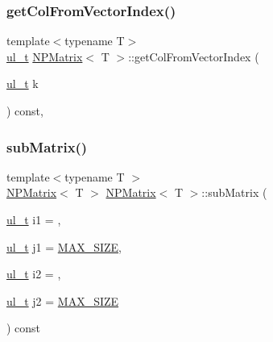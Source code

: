 \mbox{\label{class_n_p_matrix_a3ef7e9e257ba6119e369a9a3c633d35d}} 
\subsubsection{\texorpdfstring{getColFromVectorIndex()}{getColFromVectorIndex()}}
{\footnotesize\ttfamily template$<$typename T$>$ \\
\mbox{\hyperlink{group___n_algebra_ga1b140a2034db3f5dfe18a987745df43a}{ul\+\_\+t}} \mbox{\hyperlink{class_n_p_matrix}{N\+P\+Matrix}}$<$ T $>$\+::get\+Col\+From\+Vector\+Index (\begin{DoxyParamCaption}\item[{\mbox{\hyperlink{group___n_algebra_ga1b140a2034db3f5dfe18a987745df43a}{ul\+\_\+t}}}]{k }\end{DoxyParamCaption}) const\hspace{0.3cm}{\ttfamily [inline]}, {\ttfamily [protected]}}

\mbox{\label{class_n_p_matrix_a1af1b395e03d5009666214eb7f954afb}} 
\subsubsection{\texorpdfstring{subMatrix()}{subMatrix()}}
{\footnotesize\ttfamily template$<$typename T $>$ \\
\mbox{\hyperlink{class_n_p_matrix}{N\+P\+Matrix}}$<$ T $>$ \mbox{\hyperlink{class_n_p_matrix}{N\+P\+Matrix}}$<$ T $>$\+::sub\+Matrix (\begin{DoxyParamCaption}\item[{\mbox{\hyperlink{group___n_algebra_ga1b140a2034db3f5dfe18a987745df43a}{ul\+\_\+t}}}]{i1 = {},  }\item[{\mbox{\hyperlink{group___n_algebra_ga1b140a2034db3f5dfe18a987745df43a}{ul\+\_\+t}}}]{j1 = {\ttfamily \mbox{\hyperlink{_n_vector_8h_a0592dba56693fad79136250c11e5a7fe}{M\+A\+X\+\_\+\+S\+I\+ZE}}},  }\item[{\mbox{\hyperlink{group___n_algebra_ga1b140a2034db3f5dfe18a987745df43a}{ul\+\_\+t}}}]{i2 = {},  }\item[{\mbox{\hyperlink{group___n_algebra_ga1b140a2034db3f5dfe18a987745df43a}{ul\+\_\+t}}}]{j2 = {\ttfamily \mbox{\hyperlink{_n_vector_8h_a0592dba56693fad79136250c11e5a7fe}{M\+A\+X\+\_\+\+S\+I\+ZE}}} }\end{DoxyParamCaption}) const\hspace{0.3cm}{\ttfamily [protected]}}

